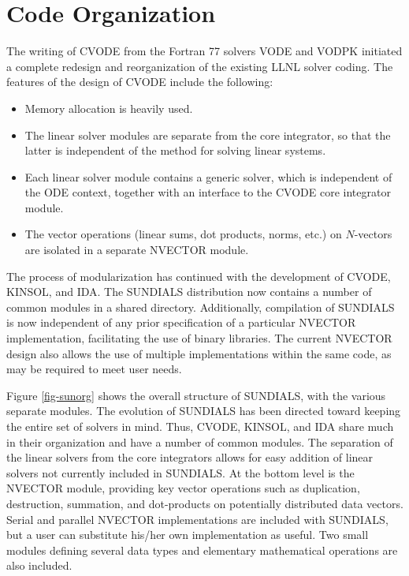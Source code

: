 \section{Code Organization}
\label{s:organization}

The writing of CVODE from the Fortran 77 solvers VODE and VODPK
initiated a complete redesign and reorganization of the existing
LLNL solver coding. The features of the design of CVODE include
the following:
\begin{itemize}
\item Memory allocation is heavily used.
\item The linear solver modules are separate from the core integrator,
so that the latter is independent of the method for solving linear
systems.
\item Each linear solver module contains  a generic solver, which is
independent of the ODE context, together with an interface to the CVODE core
integrator module.
\item The vector operations  (linear sums, dot products, norms, etc.) on
$N$-vectors are isolated in a separate NVECTOR module.
\end{itemize}

The process of modularization has continued with the development of CVODE,
KINSOL, and IDA. The SUNDIALS distribution now contains a number of common
modules in a shared directory. Additionally, compilation of SUNDIALS is now
independent of any prior specification of a particular NVECTOR
implementation, facilitating the use of binary libraries. The current
NVECTOR design also allows the use of multiple implementations within the
same code, as may be required to meet user needs.

Figure \ref{fig-sunorg} shows the overall structure of SUNDIALS, with the
various separate modules. The evolution of SUNDIALS has been directed toward
keeping the entire set of solvers in mind. Thus, CVODE, KINSOL, and IDA share
much in their organization and have a number of common modules.  The
separation of the linear solvers from the core integrators allows for easy
addition of linear solvers not currently included in SUNDIALS. At the bottom
level is the NVECTOR module, providing key vector operations such as
duplication, destruction, summation, and dot-products on potentially
distributed data vectors. Serial and parallel NVECTOR implementations are
included with SUNDIALS, but a user can substitute his/her own implementation
as useful. Two small modules defining several data types and elementary
mathematical operations are also included.

